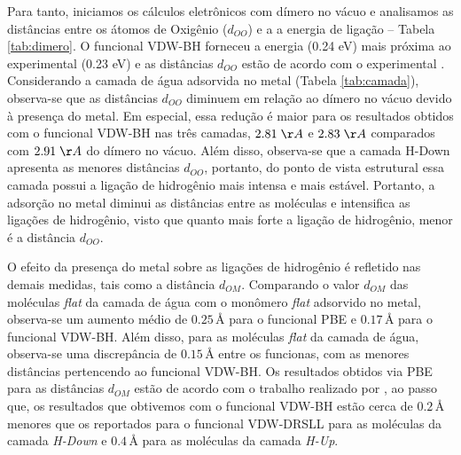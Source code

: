 Para tanto, iniciamos os cálculos eletrônicos com dímero no vácuo e analisamos as distâncias entre os átomos de Oxigênio ($d_{OO}$) e a a energia de ligação -- Tabela \ref{tab:dimero}. O funcional VDW-BH forneceu a energia (0.24 eV) mais próxima ao experimental (0.23 eV) e as distâncias $ d_{OO} $ estão de acordo com o experimental \cite{dimer-exp}. Considerando a camada de água adsorvida no metal (Tabela \ref{tab:camada}), observa-se que as distâncias $ d_{OO} $ diminuem em relação ao dímero no vácuo devido à presença do metal. Em especial, essa redução é maior para os resultados obtidos com o funcional VDW-BH nas três camadas, $2.81\;\AA$ e $2.83\;\AA$ comparados com $2.91\;\AA$ do dímero no vácuo. Além disso, observa-se que a camada H-Down apresenta as menores distâncias $d_{OO}$, portanto, do ponto de vista estrutural essa camada possui a ligação de hidrogênio mais intensa e mais estável. Portanto, a adsorção no metal diminui as distâncias entre as moléculas e intensifica as ligações de hidrogênio, visto que quanto mais forte a ligação de hidrogênio, menor é a distância $d_{OO}$. 

O efeito da presença do metal sobre as ligações de hidrogênio é refletido nas demais medidas, tais como a distância $d_{OM}$. Comparando o valor $ d_{OM} $ das moléculas \textit{flat} da camada de água com o monômero \textit{flat} adsorvido no metal, observa-se um aumento médio de $ 0.25\,\si{\angstrom} $ para o funcional PBE e $ 0.17\,\si{\angstrom} $ para o funcional VDW-BH. Além disso, para as moléculas \textit{flat} da camada de água, observa-se uma discrepância de $ 0.15\,\si{\angstrom} $ entre os funcionas, com as menores distâncias pertencendo ao funcional VDW-BH. Os resultados obtidos via PBE para as distâncias $d_{OM}$ estão de acordo com o trabalho realizado por \citeauthor{adrien}, ao passo que, os resultados que obtivemos com o funcional VDW-BH estão cerca de $ 0.2\,\si{\angstrom} $ menores que os reportados para o funcional VDW-DRSLL para as moléculas da camada \textit{H-Down} e $ 0.4\,\si{\angstrom} $ para as moléculas da camada \textit{H-Up}.





